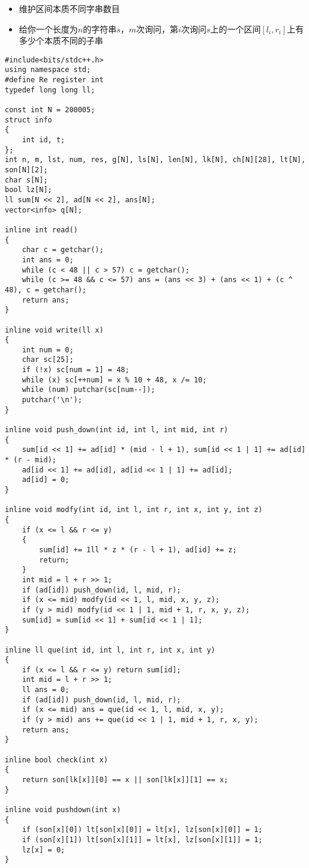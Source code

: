 \documentclass[]{article}
\providecommand{\tightlist}{%
  \setlength{\itemsep}{0pt}\setlength{\parskip}{0pt}}
\begin{document}
\begin{itemize}
\tightlist
\item
  维护区间本质不同字串数目
\item
  给你一个长度为\(n\)的字符串\(s\)，\(m\)次询问，第\(i\)次询问\(s\)上的一个区间\([l_i,r_i]\)上有多少个本质不同的子串
\end{itemize}

\begin{verbatim}
#include<bits/stdc++.h>
using namespace std;
#define Re register int
typedef long long ll;

const int N = 200005;
struct info
{
    int id, t;
};
int n, m, lst, num, res, g[N], ls[N], len[N], lk[N], ch[N][28], lt[N], son[N][2];
char s[N];
bool lz[N];
ll sum[N << 2], ad[N << 2], ans[N];
vector<info> q[N];

inline int read()
{
    char c = getchar();
    int ans = 0;
    while (c < 48 || c > 57) c = getchar();
    while (c >= 48 && c <= 57) ans = (ans << 3) + (ans << 1) + (c ^ 48), c = getchar();
    return ans;
}

inline void write(ll x)
{
    int num = 0;
    char sc[25];
    if (!x) sc[num = 1] = 48;
    while (x) sc[++num] = x % 10 + 48, x /= 10;
    while (num) putchar(sc[num--]);
    putchar('\n');
}

inline void push_down(int id, int l, int mid, int r)
{
    sum[id << 1] += ad[id] * (mid - l + 1), sum[id << 1 | 1] += ad[id] * (r - mid);
    ad[id << 1] += ad[id], ad[id << 1 | 1] += ad[id];
    ad[id] = 0;
}

inline void modfy(int id, int l, int r, int x, int y, int z)
{
    if (x <= l && r <= y)
    {
        sum[id] += 1ll * z * (r - l + 1), ad[id] += z;
        return;
    }
    int mid = l + r >> 1;
    if (ad[id]) push_down(id, l, mid, r);
    if (x <= mid) modfy(id << 1, l, mid, x, y, z);
    if (y > mid) modfy(id << 1 | 1, mid + 1, r, x, y, z);
    sum[id] = sum[id << 1] + sum[id << 1 | 1];
}

inline ll que(int id, int l, int r, int x, int y)
{
    if (x <= l && r <= y) return sum[id];
    int mid = l + r >> 1;
    ll ans = 0;
    if (ad[id]) push_down(id, l, mid, r);
    if (x <= mid) ans = que(id << 1, l, mid, x, y);
    if (y > mid) ans += que(id << 1 | 1, mid + 1, r, x, y);
    return ans;
}

inline bool check(int x)
{
    return son[lk[x]][0] == x || son[lk[x]][1] == x;
}

inline void pushdown(int x)
{
    if (son[x][0]) lt[son[x][0]] = lt[x], lz[son[x][0]] = 1;
    if (son[x][1]) lt[son[x][1]] = lt[x], lz[son[x][1]] = 1;
    lz[x] = 0;
}


\end{verbatim}
\end{document}
